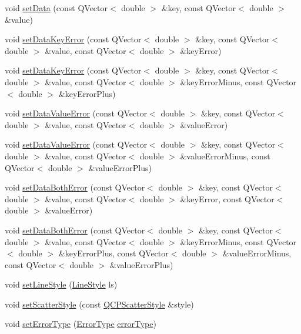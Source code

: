 \begin{DoxyCompactItemize}
\item 
void \hyperlink{class_q_c_p_graph_a4c55d8ac13bfa42c8c93747820891a76}{set\+Data} (const Q\+Vector$<$ double $>$ \&key, const Q\+Vector$<$ double $>$ \&value)
\item 
void \hyperlink{class_q_c_p_graph_abce9f07c0d722bc3e4fa7bd73c7e5dfa}{set\+Data\+Key\+Error} (const Q\+Vector$<$ double $>$ \&key, const Q\+Vector$<$ double $>$ \&value, const Q\+Vector$<$ double $>$ \&key\+Error)
\item 
void \hyperlink{class_q_c_p_graph_ac15c749c5fedf740d5692c6fe67143b8}{set\+Data\+Key\+Error} (const Q\+Vector$<$ double $>$ \&key, const Q\+Vector$<$ double $>$ \&value, const Q\+Vector$<$ double $>$ \&key\+Error\+Minus, const Q\+Vector$<$ double $>$ \&key\+Error\+Plus)
\item 
void \hyperlink{class_q_c_p_graph_acba6296eadcb36b93267628b8dae3de5}{set\+Data\+Value\+Error} (const Q\+Vector$<$ double $>$ \&key, const Q\+Vector$<$ double $>$ \&value, const Q\+Vector$<$ double $>$ \&value\+Error)
\item 
void \hyperlink{class_q_c_p_graph_a3afbfd7222d739351c69387904776f93}{set\+Data\+Value\+Error} (const Q\+Vector$<$ double $>$ \&key, const Q\+Vector$<$ double $>$ \&value, const Q\+Vector$<$ double $>$ \&value\+Error\+Minus, const Q\+Vector$<$ double $>$ \&value\+Error\+Plus)
\item 
void \hyperlink{class_q_c_p_graph_a873fe46bdb20be5710428e474ade8908}{set\+Data\+Both\+Error} (const Q\+Vector$<$ double $>$ \&key, const Q\+Vector$<$ double $>$ \&value, const Q\+Vector$<$ double $>$ \&key\+Error, const Q\+Vector$<$ double $>$ \&value\+Error)
\item 
void \hyperlink{class_q_c_p_graph_abb75736ecdbf6e6a7501e1da64fb18cf}{set\+Data\+Both\+Error} (const Q\+Vector$<$ double $>$ \&key, const Q\+Vector$<$ double $>$ \&value, const Q\+Vector$<$ double $>$ \&key\+Error\+Minus, const Q\+Vector$<$ double $>$ \&key\+Error\+Plus, const Q\+Vector$<$ double $>$ \&value\+Error\+Minus, const Q\+Vector$<$ double $>$ \&value\+Error\+Plus)
\item 
void \hyperlink{class_q_c_p_graph_a513fecccff5b2a50ce53f665338c60ff}{set\+Line\+Style} (\hyperlink{class_q_c_p_graph_ad60175cd9b5cac937c5ee685c32c0859}{Line\+Style} ls)
\item 
void \hyperlink{class_q_c_p_graph_a12bd17a8ba21983163ec5d8f42a9fea5}{set\+Scatter\+Style} (const \hyperlink{class_q_c_p_scatter_style}{Q\+C\+P\+Scatter\+Style} \&style)
\item 
void \hyperlink{class_q_c_p_graph_ac3614d799c3894f2bc646e99c7f73d38}{set\+Error\+Type} (\hyperlink{class_q_c_p_graph_ad23b514404bd2cb3216f57c90904d6af}{Error\+Type} \hyperlink{class_q_c_p_graph_a250bcdf78abac87bc6d46ee6fd99a92d}{error\+Type})

\end{DoxyCompactItemize}
